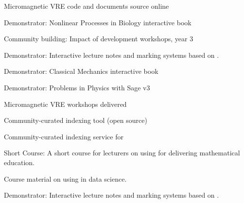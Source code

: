 \begin{workpackage}
\begin{wpdelivs}
   \begin{wpdeliv}[due=32,id=oommfnb-source-and-testing-setup,dissem=PU,nature=DEC,lead=USO]{Micromagnetic
     VRE code and documents source online} \end{wpdeliv}
 \begin{wpdeliv}[due=36,id=ibook2,dissem=PU,nature=DEM]{Demonstrator: Nonlinear Processes in Biology  interactive book} \end{wpdeliv}
 \begin{wpdeliv}[due=36,id=workshops-3,dissem=PU,nature=R]{Community building: Impact of development workshops, year 3}\end{wpdeliv}
  \begin{wpdeliv}[due=36,id=lecture-notes,dissem=PU,nature=DEM,lead=USH]{Demonstrator: Interactive lecture notes and marking systems based on \TheProject.}\end{wpdeliv}
 \begin{wpdeliv}[due=40,id=ibook2,dissem=PU,nature=DEM]{Demonstrator: Classical Mechanics interactive book} \end{wpdeliv}
 \begin{wpdeliv}[due=44,id=ibook3c,dissem=PU,nature=DEM]{Demonstrator: Problems in Physics with Sage v3} \end{wpdeliv}
 \begin{wpdeliv}[due=44,id=oommfnb-workshops,dissem=PU,nature=OTHER,lead=USO]{Micromagnetic
     VRE workshops delivered} \end{wpdeliv}
 \begin{wpdeliv}[due=24,id=ils-tool,dissem=PU,nature=P,lead=UV]{Community-curated
     indexing tool (open source)} \end{wpdeliv}
 \begin{wpdeliv}[due=24,id=ils-service,dissem=PU,nature=DEM,lead=UV]{Community-curated
     indexing service for \TheProject} \end{wpdeliv}
 \begin{wpdeliv}[due=18,id=short-course,dissem=PU,nature=DEC,lead=USH]{Short Course: A short course for lecturers on using \TheProject for delivering mathematical education.}\end{wpdeliv}
 \begin{wpdeliv}[due=24,id=datascience-course,dissem=PU,nature=DEC,lead=USH]{Course material on using \TheProject in data science.}
   \end{wpdeliv}
 \begin{wpdeliv}[due=36,id=lecture-notes,dissem=PU,nature=DEM,lead=USH]{Demonstrator: Interactive lecture notes and marking systems based on \TheProject.}\end{wpdeliv}

\end{wpdelivs}
\end{workpackage}
